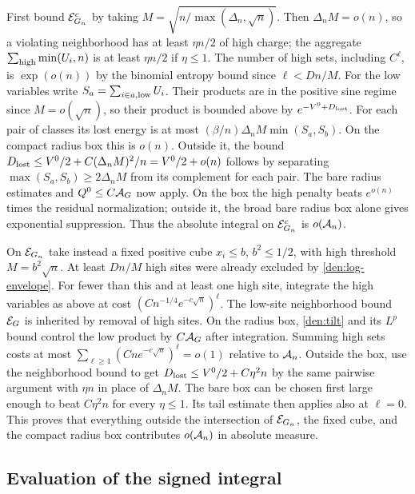First bound \({\cal E}_{G_n}^c\) by taking
\(M=\sqrt{n/\max(\Delta_n,\sqrt n)}\).
Then \(\Delta_n M=o(n)\), so a violating neighborhood has at least \(\eta n/2\) of high charge; the aggregate \(\sum_{\rm high}\min(U_i,n)\) is at least \(\eta n/2\) if \(\eta\le1\). The number of high sets, including \(C^\ell\), is \(\exp(o(n))\) by the binomial entropy bound since \(\ell<Dn/M\). For the low variables write \(S_a=\sum_{i\in a,{\rm low}}U_i\). Their products are in the positive sine regime since \(M=o(\sqrt n)\), so their product is bounded above by \(e^{-V^0+D_{\rm lost}}\). For each pair of classes its lost energy is at most \((\beta/n)\Delta_n M\min(S_a,S_b)\). On the compact radius box this is \(o(n)\). Outside it, the bound \(D_{\rm lost}\le V^0/2+C(\Delta_n M)^2/n=V^0/2+o(n)\) follows by separating \(\max(S_a,S_b)\ge2\Delta_n M\) from its complement for each pair. The bare radius estimates and \(Q^0\le C{\cal A}_{G}\) now apply. On the box the high penalty beats \(e^{o(n)}\) times the residual normalization; outside it, the broad bare radius box alone gives exponential suppression. Thus the absolute integral on \({\cal E}_{G_n}^c\) is \(o({\cal A}_n)\).

On \({\cal E}_{G_n}\) take instead a fixed positive cube \(x_i\le b\), \(b^2\le1/2\), with high threshold \(M=b^2\sqrt n\). At least \(D n/M\) high sites were already excluded by \eqref{den:log-envelope}. For fewer than this and at least one high site, integrate the high variables as above at cost \((Cn^{-1/4}e^{-c\sqrt n})^\ell\). The low-site neighborhood bound \({\cal E}_G\) is inherited by removal of high sites. On the radius box, \eqref{den:tilt} and its \(L^p\) bound control the low product by \(C{\cal A}_G\) after integration. Summing high sets costs at most \(\sum_{\ell\ge1}(Cn e^{-c\sqrt n})^\ell=o(1)\) relative to \({\cal A}_n\). Outside the box, use the neighborhood bound to get \(D_{\rm lost}\le V^0/2+C\eta^2n\) by the same pairwise argument with \(\eta n\) in place of \(\Delta_n M\). The bare box can be chosen first large enough to beat \(C\eta^2 n\) for every \(\eta\le1\). Its tail estimate then applies also at \(\ell=0\). This proves that everything outside the intersection of \({\cal E}_{G_n}\), the fixed cube, and the compact radius box contributes \(o({\cal A}_n)\) in absolute measure.

\subsection{Evaluation of the signed integral}

